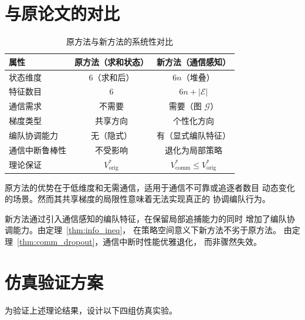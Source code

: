 \documentclass[a4paper,11pt]{article}
\theoremstyle{plain}
\theoremstyle{definition}
\theoremstyle{remark}
\newcommand{\cG}{\mathcal{G}}
\newcommand{\cE}{\mathcal{E}}
\begin{document}
\section{与原论文的对比}\label{sec:comparison}

\begin{table}[htbp]
  \centering
  \caption{原方法与新方法的系统性对比}
  \label{tab:comparison}
  \renewcommand{\arraystretch}{1.3}
  \begin{tabular}{@{}lcc@{}}
    \toprule
    \textbf{属性} & \textbf{原方法（求和状态）} & \textbf{新方法（通信感知）} \\
    \midrule
    状态维度 & $6$（求和后） & $6n$（堆叠） \\
    特征数目 & $6$ & $6n + |\cE|$ \\
    通信需求 & 不需要 & 需要（图 $\cG$） \\
    梯度类型 & 共享方向 & 个性化方向 \\
    编队协调能力 & 无（隐式） & 有（显式编队特征） \\
    通信中断鲁棒性 & 不受影响 & 退化为局部策略 \\
    理论保证 & $V^*_{\text{orig}}$ & $V^*_{\text{comm}} \le V^*_{\text{orig}}$ \\
    \bottomrule
  \end{tabular}
\end{table}

原方法的优势在于低维度和无需通信，适用于通信不可靠或追逐者数目
动态变化的场景。然而其共享梯度的局限性意味着无法实现真正的
协调编队行为。

新方法通过引入通信感知的编队特征，在保留局部追捕能力的同时
增加了编队协调能力。由定理~\ref{thm:info_ineq}，
在策略空间意义下新方法不劣于原方法。
由定理~\ref{thm:comm_dropout}，通信中断时性能优雅退化，
而非骤然失效。

\section{仿真验证方案}\label{sec:simulation}

为验证上述理论结果，设计以下四组仿真实验。
\end{document}

